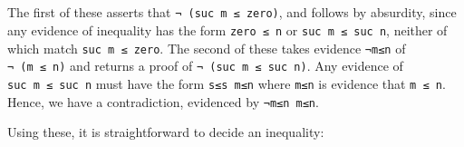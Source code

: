 \begin{fence}
\begin{code}%
\>[0]\AgdaSpace{}%
\AgdaSymbol{:}\AgdaSpace{}%
\AgdaSpace{}%
\AgdaSymbol{\{}\AgdaSpace{}%
\AgdaSymbol{:}\AgdaSpace{}%
\AgdaSymbol{\}}\AgdaSpace{}%
\AgdaSpace{}%
\AgdaSpace{}%
\AgdaSymbol{(}\AgdaSpace{}%
\AgdaSpace{}%
\AgdaSpace{}%
\AgdaSymbol{)}\<%
\\
\>[0]\AgdaSpace{}%
\AgdaSymbol{()}\<%
\\
%
\\[\AgdaEmptyExtraSkip]%
\>[0]\AgdaSpace{}%
\AgdaSymbol{:}\AgdaSpace{}%
\AgdaSpace{}%
\AgdaSymbol{\{}\AgdaSpace{}%
\AgdaSpace{}%
\AgdaSymbol{:}\AgdaSpace{}%
\AgdaSymbol{\}}\AgdaSpace{}%
\AgdaSpace{}%
\AgdaSpace{}%
\AgdaSymbol{(}\AgdaSpace{}%
\AgdaSpace{}%
\AgdaSymbol{)}\AgdaSpace{}%
\AgdaSpace{}%
\AgdaSpace{}%
\AgdaSymbol{(}\AgdaSpace{}%
\AgdaSpace{}%
\AgdaSpace{}%
\AgdaSpace{}%
\AgdaSymbol{)}\<%
\\
\>[0]\AgdaSpace{}%
\AgdaSpace{}%
\AgdaSymbol{(}\AgdaSpace{}%
\AgdaSymbol{)}\AgdaSpace{}%
\AgdaSymbol{=}\AgdaSpace{}%
\AgdaSpace{}%
\<%
\end{code}
\end{fence}

The first of these asserts that \texttt{¬\ (suc\ m\ ≤\ zero)}, and
follows by absurdity, since any evidence of inequality has the form
\texttt{zero\ ≤\ n} or \texttt{suc\ m\ ≤\ suc\ n}, neither of which
match \texttt{suc\ m\ ≤\ zero}. The second of these takes evidence
\texttt{¬m≤n} of \texttt{¬\ (m\ ≤\ n)} and returns a proof of
\texttt{¬\ (suc\ m\ ≤\ suc\ n)}. Any evidence of
\texttt{suc\ m\ ≤\ suc\ n} must have the form \texttt{s≤s\ m≤n} where
\texttt{m≤n} is evidence that \texttt{m\ ≤\ n}. Hence, we have a
contradiction, evidenced by \texttt{¬m≤n\ m≤n}.

Using these, it is straightforward to decide an inequality:

